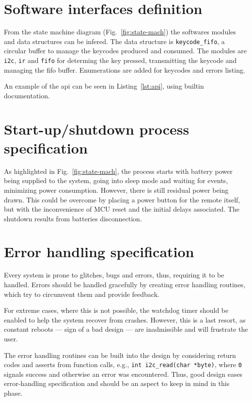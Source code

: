 \section{Software interfaces definition}
\label{sec:sw-interf-def}
%
From the state machine diagram (Fig.~\ref{fig:state-mach}) the softwares modules
and data structures can be infered. The data structure is \texttt{keycode\_fifo},
a circular buffer to manage the keycodes produced and consumed. The modules are
\texttt{i2c}, \texttt{ir} and \texttt{fifo} for determing the key pressed,
transmitting the keycode and managing the \gls{fifo} buffer. Enumerations are
added for keycodes and errors listing.

An example of the \gls{api} can be seen in Listing~\ref{lst:api}, using builtin documentation.
%
%

\section{Start-up/shutdown process specification}
\label{sec:startup-shutdown}
As highlighted in Fig.~\ref{fig:state-mach}, the process starts with battery
power being supplied to the system, going into sleep mode and waiting for
events, minimizing power consumption. However, there is still residual power
being drawn. This could be overcome by placing a power button for the remote
itself, but with the inconvenience of MCU reset and the initial delays
associated. The shutdown results from batteries disconnection.
%
  \vspace{-5mm}
%  
\section{Error handling specification}
\label{sec:error-handling-specification}
Every system is prone to glitches, bugs and errors, thus, requiring it to be
handled. Errors should be handled gracefully by creating error handling
routines, which try to circumvent them and provide feedback.

For extreme cases, where this is not possible, the watchdog timer should be
enabled to help the system recover from crashes. However, this is a last resort,
as constant reboots --- sign of a bad design --- are inadmissible and will
frustrate the user.

The error handling routines can be built into the design by considering return
codes and asserts from function calls, e.g., \texttt{int i2c\_read(char *byte)},
where \texttt{0} signals success and otherwise an error was encountered. Thus,
good design eases error-handling specification and should be an aspect to keep
in mind in this phase.
%
  \vspace{-5mm}
